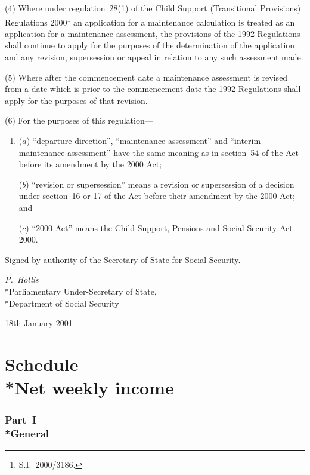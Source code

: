 \documentclass[12pt,a4paper]{article}
\begin{document}
(4) Where under regulation~28(1) of the Child Support (Transitional Provisions) Regulations 2000\footnote{S.I.~2000/3186.} an application for a maintenance calculation is treated as an application for a maintenance assessment, the provisions of the 1992 Regulations shall continue to apply for the purposes of the determination of the application and any revision, supersession or appeal in relation to any such assessment made.

(5) Where after the commencement date a maintenance assessment is revised from a date which is prior to the commencement date the 1992 Regulations shall apply for the purposes of that revision.

(6) For the purposes of this regulation—
\begin{enumerate}\item[]
($a$) “departure direction”, “maintenance assessment” and “interim maintenance assessment” have the same meaning as in section~54 of the Act before its amendment by the 2000 Act;

($b$) “revision or supersession” means a revision or supersession of a decision under section~16 or 17 of the Act before their amendment by the 2000 Act; and

($c$) “2000 Act” means the Child Support, Pensions and Social Security Act 2000.
\end{enumerate}


\bigskip

Signed 
by authority of the Secretary of State for Social Security.

{\raggedleft
\emph{P.~Hollis}\\*Parliamentary Under-Secretary of State,\\*Department of Social Security

}

18th January 2001

\vfill

\small

\part[Schedule~--- Net weekly income]{Schedule\\*Net weekly income}

\section[Part~I --- General]{Part~I\\*General}
\end{document}
